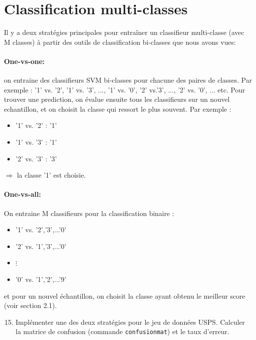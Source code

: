 \section{Classification multi-classes}

Il y a deux stratégies principales pour entraîner un classifieur multi-classe (avec M classes) à partir des outils de classification bi-classes que nous avons vues:

\paragraph{One-vs-one:} on entraine des classifieurs SVM bi-classes pour chacune des  paires de classes. Par exemple : ’1’ vs. ’2’, ’1’ vs. ’3’, ..., ’1’ vs. ’0’, ’2’ vs.’3’, ..., ’2’ vs. ’0’, ... etc. Pour trouver une prediction, on évalue ensuite tous les classifieurs sur un nouvel echantillon, et on choisit la classe qui ressort le plus souvent. Par exemple :
\begin{itemize}[label=-]
	\item '1' vs. '2' : '1'
	\item '1' vs. ’3’ : '1'
	\item '2' vs. '3' : '3'
\end{itemize}
$\Rightarrow$ la classe '1' est choisie.

\paragraph{One-vs-all:} On entraine M classifieurs pour la classification binaire :
\begin{itemize}[label=-]
	\item '1' vs. '2','3',...'0'
	\item '2' vs. '1','3',...'0'
	\item $\vdots$
	\item '0' vs. '1','2',...'9'
\end{itemize}
et pour un nouvel échantillon, on choisit la classe ayant obtenu le meilleur score (voir section 2.1).

\begin{enumerate}
	\setcounter{enumi}{14}
	\item Implémenter une des deux stratégies pour le jeu de données USPS. Calculer la matrice de confusion (commande \texttt{confusionmat}) et le taux d'erreur. 
\end{enumerate}